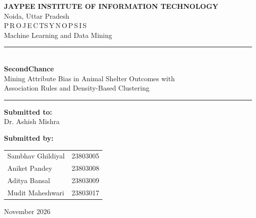 \documentclass[11pt,a4paper]{article}
\begin{document}
\pagestyle{empty}

\begin{center}
\vspace*{1.5cm}


{\color{jiitblue}\Large\bfseries JAYPEE INSTITUTE OF INFORMATION TECHNOLOGY}\\[4pt]
{\large Noida, Uttar Pradesh}\\[2.2cm]

{\large P\,R\,O\,J\,E\,C\,T\quad S\,Y\,N\,O\,P\,S\,I\,S}\\[4pt]
{\large Machine Learning and Data Mining}\\[1.0cm]

\rule{0.62\textwidth}{0.8pt}\\[0.7cm]
{\color{jiitblue}\Huge\bfseries SecondChance}\\[0.7cm]
{\large Mining Attribute Bias in Animal Shelter Outcomes with\\
Association Rules and Density-Based Clustering}\\[0.6cm]
\rule{0.62\textwidth}{0.8pt}

\vfill

\begin{minipage}[t]{0.45\textwidth}
\raggedright
{\color{jiitblue}\bfseries Submitted to:}\\[6pt]
Dr. Ashish Mishra
\end{minipage}
\hfill
\begin{minipage}[t]{0.45\textwidth}
\raggedleft
{\color{jiitblue}\bfseries Submitted by:}\\[6pt]
\begin{tabular}{@{}lr@{}}
Sambhav Ghildiyal & 23803005 \\
Aniket Pandey & 23803008 \\
Aditya Bansal & 23803009 \\
Mudit Maheshwari & 23803017 \\
\end{tabular}
\end{minipage}

\vspace{1.4cm}
November 2026
\end{center}

\newpage
\pagestyle{plain}
\setcounter{page}{1}
\end{document}
